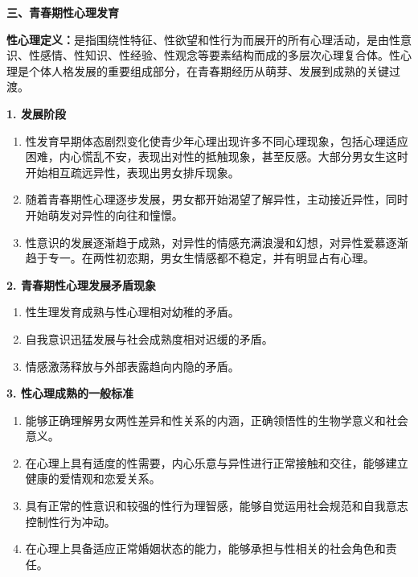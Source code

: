 \begin{defbox}
\textbf{三、青春期性心理发育}

\textbf{性心理定义：}是指围绕性特征、性欲望和性行为而展开的所有心理活动，是由性意识、性感情、性知识、性经验、性观念等要素结构而成的多层次心理复合体。性心理是个体人格发展的重要组成部分，在青春期经历从萌芽、发展到成熟的关键过渡。

\textbf{1. 发展阶段}
\begin{enumerate}[leftmargin=*]
    \item {}性发育早期体态剧烈变化使青少年心理出现许多不同心理现象，包括心理适应困难，内心慌乱不安，表现出对性的抵触现象，甚至反感。大部分男女生这时开始相互疏远异性，表现出男女排斥现象。
    \item {}随着青春期性心理逐步发展，男女都开始渴望了解异性，主动接近异性，同时开始萌发对异性的向往和憧憬。
    \item {}性意识的发展逐渐趋于成熟，对异性的情感充满浪漫和幻想，对异性爱慕逐渐趋于专一。在两性初恋期，男女生情感都不稳定，并有明显占有心理。
\end{enumerate}

\textbf{2. 青春期性心理发展矛盾现象}
\begin{enumerate}[leftmargin=*]
    \item 性生理发育成熟与性心理相对幼稚的矛盾。
    \item 自我意识迅猛发展与社会成熟度相对迟缓的矛盾。
    \item 情感激荡释放与外部表露趋向内隐的矛盾。
\end{enumerate}

\textbf{3. 性心理成熟的一般标准}
\begin{enumerate}[leftmargin=*]
    \item {}能够正确理解男女两性差异和性关系的内涵，正确领悟性的生物学意义和社会意义。
    \item {}在心理上具有适度的性需要，内心乐意与异性进行正常接触和交往，能够建立健康的爱情观和恋爱关系。
    \item {}具有正常的性意识和较强的性行为理智感，能够自觉运用社会规范和自我意志控制性行为冲动。
    \item {}在心理上具备适应正常婚姻状态的能力，能够承担与性相关的社会角色和责任。
\end{enumerate}

\vspace{3pt}
\begin{center}
\end{center}
\vspace{3pt}
\end{defbox}

